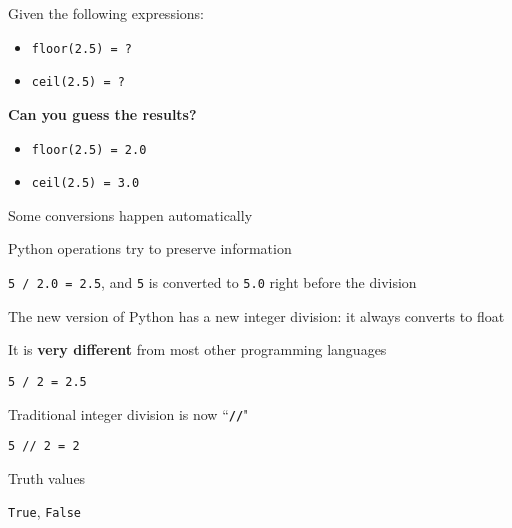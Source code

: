 \documentclass{beamer}
\begin{document}
\begin{slide}{
\item Given the following expressions:
\begin{itemize}
\item \texttt{floor(2.5) = ?} 
\item \texttt{ceil(2.5) = ?}
\end{itemize}
\item \textbf{Can you guess the results?}
\pause
\begin{itemize}
\item \texttt{floor(2.5) = 2.0}
\item \texttt{ceil(2.5) = 3.0}
\end{itemize}
}\end{slide}

\begin{slide}{
\item Some conversions happen automatically
\item Python operations try to preserve information
\item \texttt{5 / 2.0 = 2.5}, and \texttt{5} is converted to \texttt{5.0} right before the division
}\end{slide}

\begin{slide}{
\item The new version of Python has a new integer division: it always converts to float
\item It is \textbf{very different} from most other programming languages
\item \texttt{5 / 2 = 2.5}
}\end{slide}

\begin{slide}{
\item Traditional integer division is now ``\texttt{\textbf{//}}"
\item \texttt{5 // 2 = 2}
}\end{slide}

\begin{slide}{
\item Truth values
\item \texttt{True}, \texttt{False}
}\end{slide}
\end{document}
